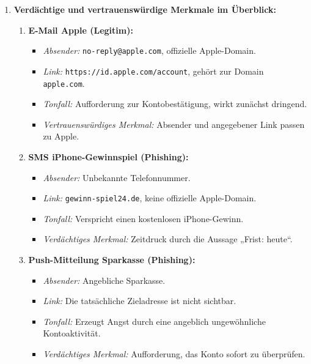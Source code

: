 \documentclass[12pt,a4paper]{article}
\begin{document}
\begin{solutionbox}
\begin{enumerate}[label=\alph*)]
    \item \textbf{Verdächtige und vertrauenswürdige Merkmale im Überblick:}
    \begin{enumerate}
        \item \textbf{E-Mail Apple (Legitim):}
        \begin{itemize}
            \item \textit{Absender:} \texttt{no-reply@apple.com}, offizielle Apple-Domain.
            \item \textit{Link:} \texttt{https://id.apple.com/account}, gehört zur Domain \texttt{apple.com}.
            \item \textit{Tonfall:} Aufforderung zur Kontobestätigung, wirkt zunächst dringend.
            \item \textit{Vertrauenswürdiges Merkmal:} Absender und angegebener Link passen zu Apple.
        \end{itemize}

        \item \textbf{SMS iPhone-Gewinnspiel (Phishing):}
        \begin{itemize}
            \item \textit{Absender:} Unbekannte Telefonnummer.
            \item \textit{Link:} \texttt{gewinn-spiel24.de}, keine offizielle Apple-Domain.
            \item \textit{Tonfall:} Verspricht einen kostenlosen iPhone-Gewinn.
            \item \textit{Verdächtiges Merkmal:} Zeitdruck durch die Aussage „Frist: heute“.
        \end{itemize}

        \item \textbf{Push-Mitteilung Sparkasse (Phishing):}
        \begin{itemize}
            \item \textit{Absender:} Angebliche Sparkasse.
            \item \textit{Link:} Die tatsächliche Zieladresse ist nicht sichtbar.
            \item \textit{Tonfall:} Erzeugt Angst durch eine angeblich ungewöhnliche Kontoaktivität.
            \item \textit{Verdächtiges Merkmal:} Aufforderung, das Konto sofort zu überprüfen.
        \end{itemize}


\end{enumerate}
\end{enumerate}
\end{solutionbox}
\end{document}
